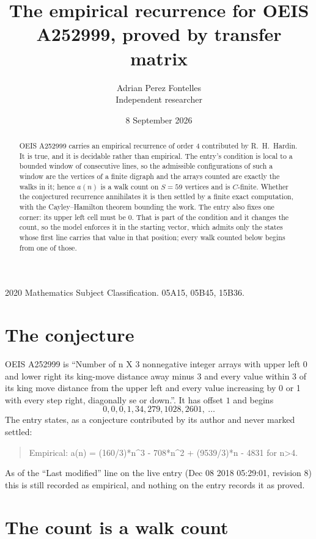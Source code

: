 \documentclass[11pt,a4paper]{article}
\title{The empirical recurrence for OEIS A252999, proved by transfer matrix}
\author{Adrian Perez Fontelles\\ \small Independent researcher}
\date{8 September 2026}
\theoremstyle{plain}
\theoremstyle{definition}
\begin{document}
\maketitle

\begin{abstract}
OEIS A252999 carries an empirical recurrence of order $4$ contributed by R.~H.~Hardin. It is
true, and it is decidable rather than empirical. The entry's condition is local to a bounded window of consecutive lines, so
the admissible configurations of such a window are the vertices of a finite digraph and the
arrays counted are exactly the walks in it; hence $a(n)$ is a walk count on $S=59$ vertices
and is $C$-finite. Whether the conjectured recurrence annihilates it is then settled by a
finite exact computation, with the Cayley--Hamilton theorem bounding the work.
 The entry also fixes one corner: its upper left cell must be $0$. That is part of the condition and it changes the count, so the model enforces it in the starting vector, which admits only the states whose first line carries that value in that position; every walk counted below begins from one of those.\end{abstract}

\noindent\small 2020 Mathematics Subject Classification. 05A15, 05B45, 15B36.\normalsize

\section{The conjecture}

OEIS A252999 is ``Number of n X 3 nonnegative integer arrays with upper left 0 and lower right its king-move distance away minus 3 and every value within 3 of its king move distance from the upper left and every value increasing by 0 or 1 with every step right, diagonally se or down.''. It has offset $1$ and begins
\[
0, 0, 0, 1, 34, 279, 1028, 2601,\ \dots
\]
The entry states, as a conjecture contributed by its author and never marked settled:
\begin{quote}
Empirical: a(n) = (160/3)*n\^{}3 - 708*n\^{}2 + (9539/3)*n - 4831 for n>4.
\end{quote}
As of the ``Last modified'' line on the live entry (Dec 08 2018 05:29:01, revision 8) this is still
recorded as empirical, and nothing on the entry records it as proved.

\section{The count is a walk count}
\end{document}
